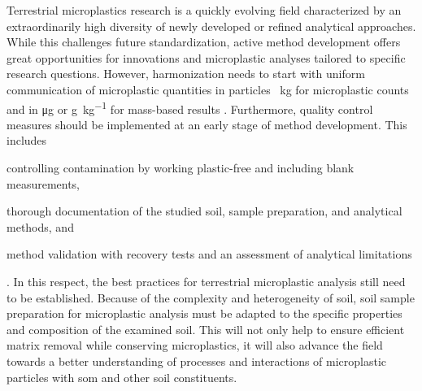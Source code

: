 Terrestrial microplastics research is a quickly evolving field characterized by an extraordinarily high diversity of newly developed or refined analytical approaches. While this challenges future standardization, active method development offers great opportunities for innovations and microplastic analyses tailored to specific research questions. However, harmonization needs to start with uniform communication of microplastic quantities in particles \si{\per\kilo\gram} for microplastic counts and in \si{\micro\gram} or \si{\gram\per\kilo\gram} for mass-based results \citep{BraunMicroplastics2018}. Furthermore, quality control measures should be implemented at an early stage of method development.
This includes
\begin{enumerate*}
	\item controlling contamination by working plastic-free and including blank measurements, 
	\item thorough documentation of the studied soil, sample preparation, and analytical methods, and
	\item method validation with recovery tests and an assessment of analytical limitations
\end{enumerate*}.
In this respect, the best practices for terrestrial microplastic analysis still need to be established. Because of the complexity and heterogeneity of soil, soil sample preparation for microplastic analysis must be adapted to the specific properties and composition of the examined soil.
This will not only help to ensure efficient matrix removal while conserving microplastics, it will also advance the field towards a better understanding of processes and interactions of microplastic particles with \ac{som} and other soil constituents.
